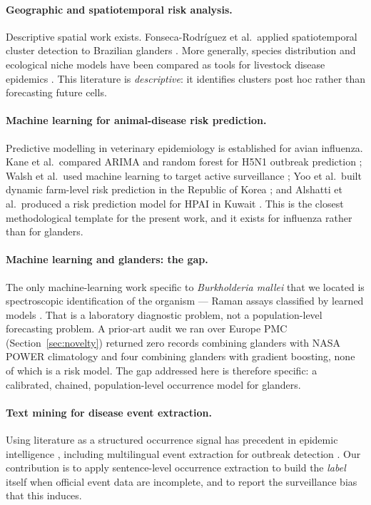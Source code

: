 \documentclass[11pt]{article}
\begin{document}
\paragraph{Geographic and spatiotemporal risk analysis.}
Descriptive spatial work exists. Fonseca-Rodr\'iguez et al.\ applied spatiotemporal cluster
detection to Brazilian glanders \cite{fonseca2019}. More generally, species distribution
and ecological niche models have been compared as tools for livestock disease
epidemics \cite{hollings2017}. This literature is \emph{descriptive}: it identifies
clusters post hoc rather than forecasting future cells.

\paragraph{Machine learning for animal-disease risk prediction.}
Predictive modelling in veterinary epidemiology is established for avian influenza.
Kane et al.\ compared ARIMA and random forest for H5N1 outbreak prediction
\cite{kane2014}; Walsh et al.\ used machine learning to target active surveillance
\cite{walsh2019}; Yoo et al.\ built dynamic farm-level risk prediction in the Republic of
Korea \cite{yoo2022}; and Alshatti et al.\ produced a risk prediction model for HPAI in
Kuwait \cite{alshatti2026}. This is the closest methodological template for the present
work, and it exists for influenza rather than for glanders.

\paragraph{Machine learning and glanders: the gap.}
The only machine-learning work specific to \emph{Burkholderia mallei} that we located is
spectroscopic identification of the organism --- Raman assays classified by learned
models \cite{moawad2019,stoeckel2015}. That is a laboratory diagnostic problem, not a
population-level forecasting problem. A prior-art audit we ran over Europe PMC
(Section~\ref{sec:novelty}) returned zero records combining glanders with NASA POWER
climatology and four combining glanders with gradient boosting, none of which is a risk
model. The gap addressed here is therefore specific: a calibrated, chained,
population-level occurrence model for glanders.

\paragraph{Text mining for disease event extraction.}
Using literature as a structured occurrence signal has precedent in epidemic intelligence
\cite{collier2012}, including multilingual event extraction for outbreak
detection \cite{lejeune2015}. Our contribution is to apply sentence-level occurrence
extraction to build the \emph{label} itself when official event data are incomplete, and
to report the surveillance bias that this induces.
\end{document}
